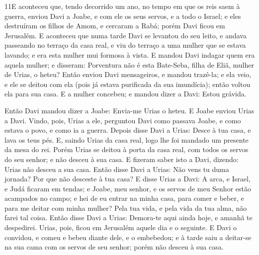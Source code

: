 \medskip

\lettrine{11} E aconteceu que, tendo decorrido um ano, no
tempo em que os reis saem à guerra, enviou Davi a Joabe, e com ele
os seus servos, e a todo o Israel; e eles destruíram os filhos de
Amom, e cercaram a Rabá; porém Davi ficou em Jerusalém. E
aconteceu que numa tarde Davi se levantou do seu leito, e andava
passeando no terraço da casa real, e viu do terraço a uma mulher que
se estava lavando; e era esta mulher mui formosa à vista. E
mandou Davi indagar quem era aquela mulher; e disseram: Porventura
não é esta Bate-Seba, filha de Eliã, mulher de Urias, o heteu?
Então enviou Davi mensageiros, e mandou trazê-la; e ela veio, e
ele se deitou com ela (pois já estava purificada da sua imundícia);
então voltou ela para sua casa. E a mulher concebeu; e mandou
dizer a Davi: Estou grávida.

Então Davi mandou dizer a Joabe: Envia-me Urias o heteu. E Joabe
enviou Urias a Davi. Vindo, pois, Urias a ele, perguntou Davi
como passava Joabe, e como estava o povo, e como ia a guerra.
Depois disse Davi a Urias: Desce à tua casa, e lava os teus pés.
E, saindo Urias da casa real, logo lhe foi mandado um presente da
mesa do rei. Porém Urias se deitou à porta da casa real, com
todos os servos do seu senhor; e não desceu à sua casa. E
fizeram saber isto a Davi, dizendo: Urias não desceu a sua casa.
Então disse Davi a Urias: Não vens tu duma jornada? Por que não
desceste à tua casa? E disse Urias a Davi: A arca, e Israel,
e Judá ficaram em tendas; e Joabe, meu senhor, e os servos de meu
Senhor estão acampados no campo; e hei de eu entrar na minha casa,
para comer e beber, e para me deitar com minha mulher? Pela tua
vida, e pela vida da tua alma, não farei tal coisa. Então
disse Davi a Urias: Demora-te aqui ainda hoje, e amanhã te
despedirei. Urias, pois, ficou em Jerusalém aquele dia e o seguinte.
E Davi o convidou, e comeu e bebeu diante dele, e o
embebedou; e à tarde saiu a deitar-se na sua cama com os servos de
seu senhor; porém não desceu à sua casa.

